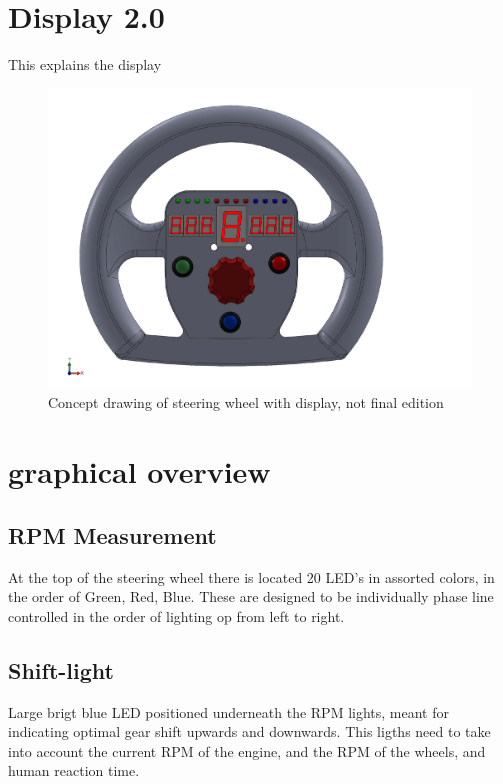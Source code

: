 \section{Display 2.0}
This explains the display
\begin{figure}
	\begin{center}
		\includegraphics[scale=0.3]{G6SteeringWheelV3.pdf}
		\caption{Concept drawing of steering wheel with display, not final edition}
	\end{center}
\end{figure}
\section{graphical overview}
\subsection*{RPM Measurement}
At the top of the steering wheel there is located 20 LED's in assorted colors, in the order of Green, Red, Blue. These are designed to be individually phase line controlled in the order of lighting op from left to right.

\subsection*{Shift-light}
Large brigt blue LED positioned underneath the RPM lights, meant for indicating optimal gear shift upwards and downwards. This ligths need to take into account the current RPM of the engine, and the RPM of the wheels, and human reaction time.

